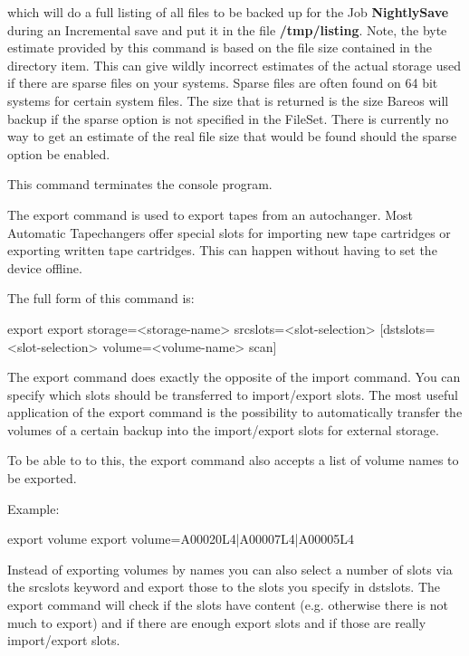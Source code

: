 \begin{description}
   which will do a full listing of all files to be backed up for the  Job {\bf
   NightlySave} during an Incremental save and put it in the  file {\bf
   /tmp/listing}.  Note, the byte estimate provided by this command is
   based on the file size contained in the directory item. This can give
   wildly incorrect estimates of the actual storage used if there are
   sparse files on your systems. Sparse files are often found on 64 bit
   systems for certain system files. The size that is returned is the size
   Bareos will backup if the sparse option is not specified in the FileSet.
   There is currently no way to get an estimate of the real file size that
   would be found should the sparse option be enabled.

\item [exit]
   This command terminates the console program.

\item [export]
   The export command is used to export tapes from an autochanger. Most Automatic
   Tapechangers offer special slots for importing new tape cartridges or
   exporting written tape cartridges. This can happen without having to set
   the device offline.

   The full form of this command is:

\begin{bconsole}{export}
export storage=<storage-name> srcslots=<slot-selection> [dstslots=<slot-selection> volume=<volume-name> scan]
\end{bconsole}

   The export command does exactly the opposite of the import command. You
   can specify which slots should be transferred to import/export slots. The
   most useful application of the export command is the possibility to
   automatically transfer the volumes of a certain backup into the import/export
   slots for external storage.

   To be able to to this, the export command also accepts a list of volume names
   to be exported.

   Example:

\begin{bconsole}{export volume}
export volume=A00020L4|A00007L4|A00005L4
\end{bconsole}

   Instead of exporting volumes by names you can also select a number of slots via
   the srcslots keyword and export those to the slots you specify in dstslots. The export
   command will check if the slots have content (e.g. otherwise there is not much to
   export) and if there are enough export slots and if those are really import/export slots.


\end{description}
